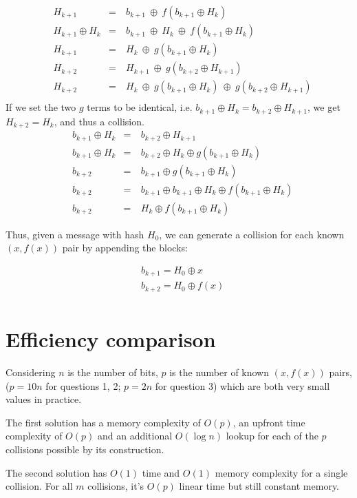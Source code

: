\documentclass[11pt]{llncs}
\begin{document}
\[ \begin{aligned}
& H_{k+1} &=&\ b_{k+1}\ \oplus\ f(b_{k+1} \oplus H_k) \\
& H_{k+1} \oplus H_k &=&\ b_{k+1}\ \oplus\ H_k\ \oplus\ f(b_{k+1} \oplus H_k) \\
& H_{k+1} &=&\ H_k\ \oplus\ g(b_{k+1} \oplus H_k) \\
& H_{k+2} &=&\ H_{k+1}\ \oplus\ g(b_{k+2} \oplus H_{k+1}) \\
& H_{k+2} &=&\ H_k\ \oplus\ g(b_{k+1} \oplus H_k)\ \oplus\ g(b_{k+2} \oplus H_{k+1}) \\
\end{aligned} \]
If we set the two $g$ terms to be identical, i.e. $b_{k+1} \oplus H_k = b_{k+2} \oplus H_{k+1}$, we get $H_{k+2} = H_k$, and thus a collision.
\[ \begin{aligned}
& b_{k+1} \oplus H_k &=&\ b_{k+2} \oplus H_{k+1} \\
& b_{k+1} \oplus H_k &=&\ b_{k+2} \oplus H_k \oplus g(b_{k+1} \oplus H_k) \\
& b_{k+2} &=&\ b_{k+1} \oplus g(b_{k+1} \oplus H_k) \\
& b_{k+2} &=&\ b_{k+1} \oplus b_{k+1} \oplus H_k \oplus f(b_{k+1} \oplus H_k) \\
& b_{k+2} &=&\ H_k \oplus f(b_{k+1} \oplus H_k)
\end{aligned} \]

Thus, given a message with hash $H_0$, we can generate a collision for each known $(x, f(x))$ pair by appending the blocks:

\[ \begin{aligned}
& b_{k+1} = H_0 \oplus x \\
& b_{k+2} = H_0 \oplus f(x) \\
\end{aligned} \]

\newpage
\section{Efficiency comparison}

Considering $n$ is the number of bits, $p$ is the number of known $(x,f(x))$ pairs, ($p=10n$ for questions 1, 2; $p=2n$ for question 3) which are both very small values in practice.

The first solution has a memory complexity of $O(p)$, an upfront time complexity of $O(p)$ and an additional $O(\log{n})$ lookup for each of the $p$ collisions possible by its construction.

The second solution has $O(1)$ time and $O(1)$ memory complexity for a single collision. For all $m$ collisions, it's $O(p)$ linear time but still constant memory.
\end{document}
